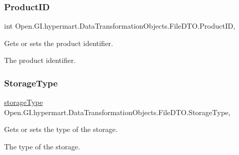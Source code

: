 \subsubsection{\texorpdfstring{Product\+ID}{ProductID}}
{\footnotesize\ttfamily int Open.\+G\+I.\+hypermart.\+Data\+Transformation\+Objects.\+File\+D\+T\+O.\+Product\+ID\hspace{0.3cm}{\ttfamily [get]}, {\ttfamily [set]}}



Gets or sets the product identifier. 

The product identifier. \hypertarget{class_open_1_1_g_i_1_1hypermart_1_1_data_transformation_objects_1_1_file_d_t_o_a4563713ee116eb1163eaac1f242b395f}{}\label{class_open_1_1_g_i_1_1hypermart_1_1_data_transformation_objects_1_1_file_d_t_o_a4563713ee116eb1163eaac1f242b395f} 
\subsubsection{\texorpdfstring{Storage\+Type}{StorageType}}
{\footnotesize\ttfamily \hyperlink{namespace_open_1_1_g_i_1_1hypermart_1_1_models_a21c5ffa7da75ad8a6d2b04798113f9db}{storage\+Type} Open.\+G\+I.\+hypermart.\+Data\+Transformation\+Objects.\+File\+D\+T\+O.\+Storage\+Type\hspace{0.3cm}{\ttfamily [get]}, {\ttfamily [set]}}



Gets or sets the type of the storage. 

The type of the storage. \hypertarget{class_open_1_1_g_i_1_1hypermart_1_1_data_transformation_objects_1_1_file_d_t_o_ac55a6e7062078277eed54e42b7c29d73}{}\label{class_open_1_1_g_i_1_1hypermart_1_1_data_transformation_objects_1_1_file_d_t_o_ac55a6e7062078277eed54e42b7c29d73} 
